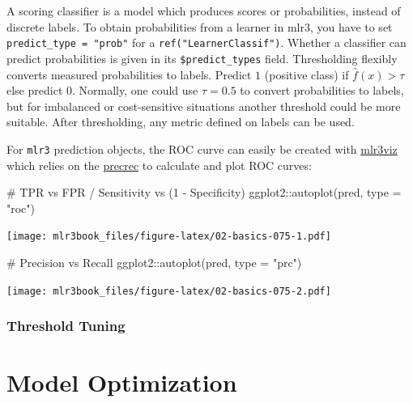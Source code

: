 \documentclass[]{article}
\newenvironment{Shaded}{}{}
\newcommand{\CommentTok}[1]{\textcolor[rgb]{0.00,0.50,0.00}{#1}}
\newcommand{\DataTypeTok}[1]{#1}
\newcommand{\KeywordTok}[1]{\textcolor[rgb]{0.00,0.00,1.00}{#1}}
\newcommand{\NormalTok}[1]{#1}
\newcommand{\OperatorTok}[1]{#1}
\newcommand{\StringTok}[1]{\textcolor[rgb]{0.00,0.50,0.50}{#1}}
\renewenvironment{Shaded} {\begin{snugshade}\small} {\end{snugshade}}
\begin{document}
A scoring classifier is a model which produces scores or probabilities, instead of discrete labels.
To obtain probabilities from a learner in mlr3, you have to set \texttt{predict\_type\ =\ "prob"} for a \texttt{ref("LearnerClassif")}.
Whether a classifier can predict probabilities is given in its \texttt{\$predict\_types} field.
Thresholding flexibly converts measured probabilities to labels.
Predict \(1\) (positive class) if \(\hat{f}(x) > \tau\) else predict \(0\).
Normally, one could use \(\tau = 0.5\) to convert probabilities to labels, but for imbalanced or cost-sensitive situations another threshold could be more suitable.
After thresholding, any metric defined on labels can be used.

For \texttt{mlr3} prediction objects, the ROC curve can easily be created with \href{https://mlr3viz.mlr-org.com}{mlr3viz} which relies on the \href{https://cran.r-project.org/package=precrec}{precrec} to calculate and plot ROC curves:

\begin{Shaded}
\begin{Highlighting}[]
\CommentTok{# TPR vs FPR / Sensitivity vs (1 - Specificity)}
\NormalTok{ggplot2}\OperatorTok{::}\KeywordTok{autoplot}\NormalTok{(pred, }\DataTypeTok{type =} \StringTok{"roc"}\NormalTok{)}
\end{Highlighting}
\end{Shaded}

\texttt{[image: mlr3book\_files/figure-latex/02-basics-075-1.pdf]}

\begin{Shaded}
\begin{Highlighting}[]

\CommentTok{# Precision vs Recall}
\NormalTok{ggplot2}\OperatorTok{::}\KeywordTok{autoplot}\NormalTok{(pred, }\DataTypeTok{type =} \StringTok{"prc"}\NormalTok{)}
\end{Highlighting}
\end{Shaded}

\texttt{[image: mlr3book\_files/figure-latex/02-basics-075-2.pdf]}

\hypertarget{threshold-tuning}{%
\subsubsection{Threshold Tuning}\label{threshold-tuning}}

\hypertarget{model-optim}{%
\section{Model Optimization}\label{model-optim}}
\end{document}
